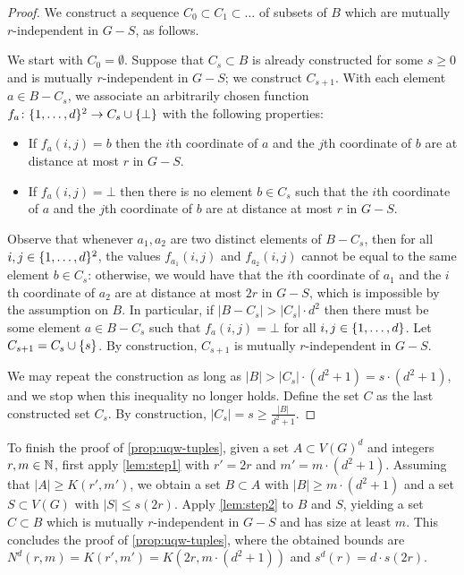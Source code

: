 \begin{proof}
We construct a sequence $C_0\subset C_1\subset \ldots$ of subsets of $B$ which are mutually $r$-independent in $G-S$, as follows.

We start with $C_0=\emptyset$. Suppose that $C_s\subset B$ is 
 already constructed for some $s\ge 0$
 and is mutually $r$-independent in $G-S$; we construct $C_{s+1}$. With each element $a\in B-C_s$,
we associate an arbitrarily chosen function $f_a\colon \{1,\ldots,d\}^2\to C_s\cup \{\bot\}$
with the following properties:
\begin{itemize}
	\item If $f_a(i,j)=b$ then the $i$th coordinate of $a$
	and the $j$th coordinate of $b$ are at distance at most $r$
	in $G-S$.
	\item If $f_a(i,j)=\bot$ then there is no element $b\in C_s$ 
	such that the $i$th coordinate of $a$ and the $j$th coordinate of $b$ are at distance at most $r$ in $G-S$.	
\end{itemize}
Observe that whenever $a_1, a_2$ are two distinct elements of $B-C_s$,
then for all $i,j\in \{1,\ldots,d\}^2$, the values $f_{a_1}(i,j)$ and $f_{a_2}(i,j)$
cannot be equal to the same element $b\in C_s$:
otherwise, we would have that the $i$th coordinate of $a_1$
and the $i$th coordinate of $a_2$ are at distance at most $2r$
in $G-S$, which is impossible by the assumption on $B$.
In particular, if $|B-C_s|> |C_s|\cdot d^2$
then there must be some element  $a\in B-C_s$  
such that $f_a(i,j)=\bot$  for all $i,j\in\{1,\ldots,d\}$.
Let $C_{s+1}=C_s\cup \{s\}$.
By construction, $C_{s+1}$ is mutually $r$-independent in $G-S$.

We may repeat the construction as long as $|B|>|C_s|\cdot (d^2+1)=s\cdot (d^2+1)$, and we stop when this inequality no longer holds. Define the set $C$ as the last constructed set $C_s$.
By construction, $|C_s|=s\ge 
\frac{|B|}{d^2+1}$.	
\end{proof}

To finish the proof of \cref{prop:uqw-tuples},
given a set $A\subset V(G)^d$ and integers $r,m\in\mathbb{N}$,
first apply 
\cref{lem:step1} 
  with $r'=2r$ and
 $m'= m\cdot (d^2+1)$.
 Assuming that $|A|\ge K(r',m')$, 
we obtain a set $B\subset A$ with $|B|\ge m\cdot (d^2+1)$ and a set $S\subset V(G)$ with $|S|\le s(2r)$.
Apply \cref{lem:step2} to $B$ and $S$, yielding a set $C\subset B$ which is mutually $r$-independent in $G-S$ and has size at least $m$. This concludes the proof of \cref{prop:uqw-tuples},
where the obtained bounds are $N^d(r,m)=K(r',m')=K(2r,m\cdot (d^2+1))$ and $s^d(r)=d\cdot s(2r)$.


